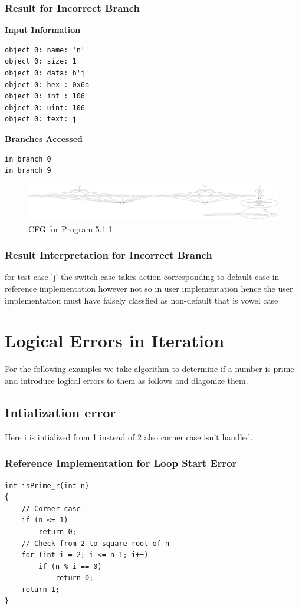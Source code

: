 \subsubsection{Result for Incorrect Branch}
\textbf{Input Information}
\begin{verbatim}
object 0: name: 'n'
object 0: size: 1
object 0: data: b'j'
object 0: hex : 0x6a
object 0: int : 106
object 0: uint: 106
object 0: text: j
\end{verbatim}
\textbf{Branches Accessed}
\begin{verbatim}
in branch 0
in branch 9
\end{verbatim}
\begin{figure}[h]
\centering
\includegraphics[width=1\textwidth]{5/5.1.1.c.png}
\caption{CFG for Program 5.1.1}
\label{fig:cfg5.1.1}
\end{figure}
\subsubsection{Result Interpretation for Incorrect Branch}
for test case 'j' the switch case takes action corresponding to default case in reference implementation however not so in user implementation hence the user implementation must have falsely classfied as non-default that is vowel case


\section{Logical Errors in Iteration}
For the following examples we take algorithm to determine if a number is prime and introduce logical errors to them as follows and diagonize them.
\subsection{Intialization error}
Here i is intialized from 1 instead of 2 also corner case isn't handled.
\subsubsection{Reference Implementation for Loop Start Error}
\begin{verbatim}
int isPrime_r(int n)
{
    // Corner case
    if (n <= 1)
        return 0;
    // Check from 2 to square root of n
    for (int i = 2; i <= n-1; i++)
        if (n % i == 0)
            return 0;
    return 1;
}
\end{verbatim}
